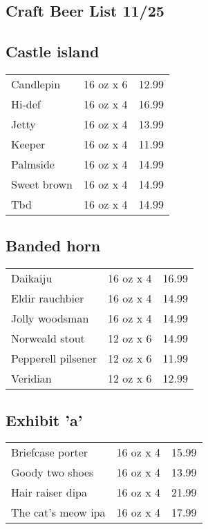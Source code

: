 \documentclass{article}%
\begin{document}
%
\pagestyle{empty}%
\normalsize%
%
\setlength{\columnseprule}{0.5pt}%
\setlength{\columnsep}{1cm}%
\renewcommand{\familydefault}{\sfdefault}%
\sffamily%
\begin{multicols}{3}%
\section*{\selectfont Craft Beer List 11/25}%

%
\subsection*{Castle island}%
\begin{tabular}{l c r}%
Candlepin&16 oz x 6&12.99\\%
Hi{-}def&16 oz x 4&16.99\\%
Jetty&16 oz x 4&13.99\\%
Keeper&16 oz x 4&11.99\\%
Palmside&16 oz x 4&14.99\\%
Sweet brown&16 oz x 4&14.99\\%
Tbd&16 oz x 4&14.99\\%
\end{tabular}

%
\subsection*{Banded horn}%
\begin{tabular}{l c r}%
Daikaiju&16 oz x 4&16.99\\%
Eldir rauchbier&16 oz x 4&14.99\\%
Jolly woodsman&16 oz x 4&14.99\\%
Norweald stout&12 oz x 6&14.99\\%
Pepperell pilsener&12 oz x 6&11.99\\%
Veridian&12 oz x 6&12.99\\%
\end{tabular}

%
\subsection*{Exhibit 'a'}%
\begin{tabular}{l c r}%
Briefcase porter&16 oz x 4&15.99\\%
Goody two shoes&16 oz x 4&13.99\\%
Hair raiser dipa&16 oz x 4&21.99\\%
The cat's meow ipa&16 oz x 4&17.99\\%
\end{tabular}


\end{multicols}
\end{document}
